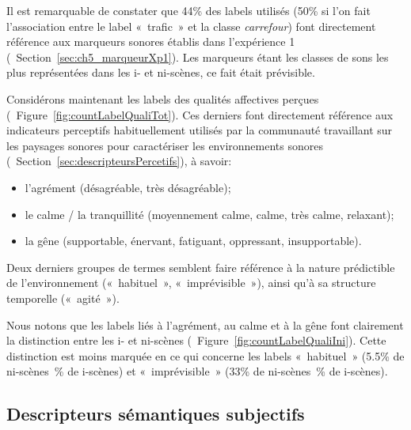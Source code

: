  
Il est remarquable de constater que 44\% des labels utilisés (50\% si l'on fait l'association entre le label «~trafic~» et la classe \emph{carrefour}) font directement référence aux marqueurs sonores établis dans l'expérience 1 (\cf~Section~\ref{sec:ch5_marqueurXp1}). Les marqueurs étant les classes de sons les plus représentées dans les i- et ni-scènes, ce fait était prévisible.

Considérons maintenant les labels des qualités affectives perçues (\cf~Figure~\ref{fig:countLabelQualiTot}). Ces derniers font directement référence aux indicateurs perceptifs habituellement utilisés par la communauté travaillant sur les paysages sonores pour caractériser les environnements sonores (\cf~Section~\ref{sec:descripteursPercetifs}), à savoir:

\begin{itemize}
\item l'agrément (désagréable, très désagréable);
\item le calme / la tranquillité (moyennement calme, calme, très calme, relaxant);
\item la gêne (supportable, énervant, fatiguant, oppressant, insupportable).
\end{itemize}

Deux derniers groupes de termes semblent faire référence à la nature prédictible de l'environnement («~habituel~», «~imprévisible~»), ainsi qu'à sa structure temporelle («~agité~»). 

Nous notons que les labels liés à l'agrément, au calme et à la gêne font clairement la distinction entre les i- et ni-scènes (\cf~Figure~\ref{fig:countLabelQualiIni}). Cette distinction est moins marquée en ce qui concerne les labels «~habituel~» (5.5\% de ni-scènes~\% de i-scènes) et «~imprévisible~» (33\% de ni-scènes~\% de i-scènes).

\subsection{Descripteurs sémantiques subjectifs}


